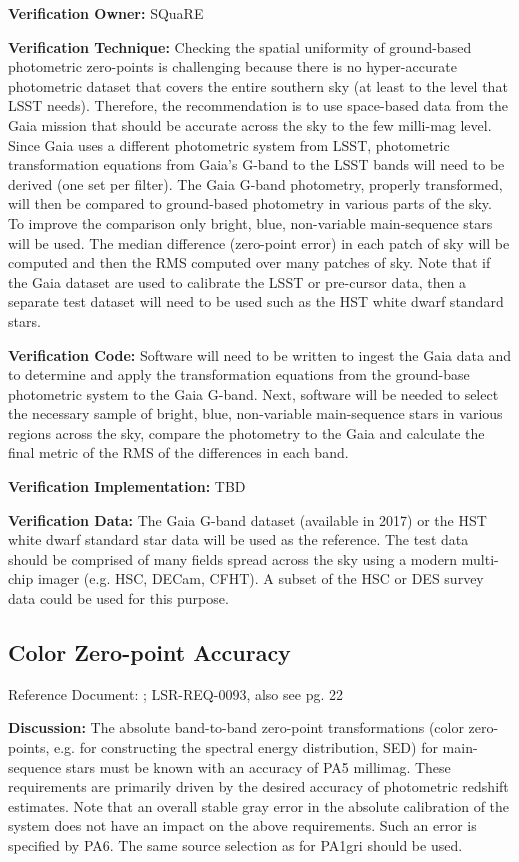 \documentclass[DM,lsstdraft,toc]{lsstdoc}
\begin{document}
\textbf{Verification Owner:} SQuaRE

\textbf{Verification Technique:} Checking the spatial uniformity of
ground-based photometric zero-points is challenging because there is no
hyper-accurate photometric dataset that covers the entire southern sky
(at least to the level that LSST needs). Therefore, the recommendation
is to use space-based data from the Gaia mission that should be accurate
across the sky to the few milli-mag level. Since Gaia uses a different
photometric system from LSST, photometric transformation equations from
Gaia's G-band to the LSST bands will need to be derived (one set per
filter). The Gaia G-band photometry, properly transformed, will then be
compared to ground-based photometry in various parts of the sky. To
improve the comparison only bright, blue, non-variable main-sequence
stars will be used. The median difference (zero-point error) in each
patch of sky will be computed and then the RMS computed over many
patches of sky. Note that if the Gaia dataset are used to calibrate the
LSST or pre-cursor data, then a separate test dataset will need to be
used such as the HST white dwarf standard stars.

\textbf{Verification Code:} Software will need to be written to ingest
the Gaia data and to determine and apply the transformation equations
from the ground-base photometric system to the Gaia G-band. Next,
software will be needed to select the necessary sample of bright, blue,
non-variable main-sequence stars in various regions across the sky,
compare the photometry to the Gaia and calculate the final metric of the
RMS of the differences in each band.

\textbf{Verification Implementation:} TBD

\textbf{Verification Data:} The Gaia G-band dataset (available in 2017)
or the HST white dwarf standard star data will be used as the reference.
The test data should be comprised of many fields spread across the sky
using a modern multi-chip imager (e.g. HSC, DECam, CFHT). A subset of
the HSC or DES survey data could be used for this purpose.

\subsection{Color Zero-point Accuracy}\label{color-zero-point-accuracy}

Reference Document: ; LSR-REQ-0093, also see \SRD pg. 22

\textbf{Discussion:} The absolute band-to-band zero-point
transformations (color zero-points, e.g. for constructing the spectral
energy distribution, SED) for main-sequence stars must be known with an
accuracy of PA5 millimag. These requirements are primarily driven by the
desired accuracy of photometric redshift estimates. Note that an overall
stable gray error in the absolute calibration of the system does not
have an impact on the above requirements. Such an error is specified by
PA6. The same source selection as for PA1gri should be used.
\end{document}
